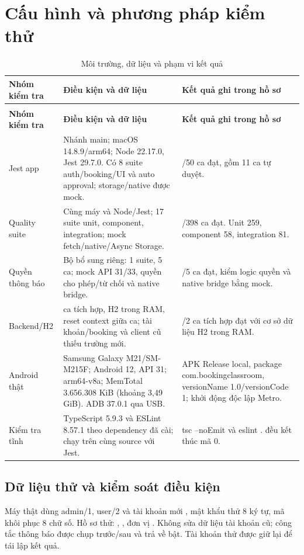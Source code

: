 \section{Cấu hình và phương pháp kiểm thử}
{\tabletext\renewcommand{\arraystretch}{1.04}\begin{longtable}{>{\raggedright\arraybackslash}p{}>{\raggedright\arraybackslash}p{}>{\raggedright\arraybackslash}p{}}
\caption{Môi trường, dữ liệu và phạm vi kết quả}\label{tab:test-env}\\
\toprule \textbf{Nhóm kiểm tra} & \textbf{Điều kiện và dữ liệu} & \textbf{Kết quả ghi trong hồ sơ}\\\midrule
\endfirsthead
\multicolumn{3}{l}{\small Môi trường, dữ liệu và phạm vi kết quả (tiếp)}\\
\toprule \textbf{Nhóm kiểm tra} & \textbf{Điều kiện và dữ liệu} & \textbf{Kết quả ghi trong hồ sơ}\\\midrule
\endhead
\bottomrule\endlastfoot
Jest app & Nhánh main; macOS 14.8.9/arm64; Node 22.17.0, Jest 29.7.0. Có 8 suite auth/booking/UI và auto approval; storage/native được mock. & 50/50 ca đạt, gồm 11 ca tự duyệt.\\
Quality suite & Cùng máy và Node/Jest; 17 suite unit, component, integration; mock fetch/native/Async Storage. & 398/398 ca đạt. Unit 259, component 58, integration 81.\\
Quyền thông báo & Bộ bổ sung riêng: 1 suite, 5 ca; mock API 31/33, quyền cho phép/từ chối và native bridge. & 5/5 ca đạt, kiểm logic quyền và native bridge bằng mock.\\
Backend/H2 & 2 ca tích hợp, H2 trong RAM, reset context giữa ca; tài khoản/booking và client cũ thiếu trường mới. & 2/2 ca tích hợp đạt với cơ sở dữ liệu H2 trong RAM.\\
Android thật & Samsung Galaxy M21/SM-M215F; Android 12, API 31; arm64-v8a; MemTotal 3.656.308 KiB (khoảng 3,49 GiB). ADB 37.0.1 qua USB. & APK Release local, package com.bookingclassroom, versionName 1.0/versionCode 1; khởi động độc lập Metro.\\
Kiểm tra tĩnh & TypeScript 5.9.3 và ESLint 8.57.1 theo dependency đã cài; chạy trên cùng source với Jest. & tsc --noEmit và eslint . đều kết thúc mã 0.\\
\end{longtable}}

\subsection{Dữ liệu thử và kiểm soát điều kiện}
Máy thật dùng admin/1, user/2 và tài khoản mới , mật khẩu thử 8 ký tự, mã khôi phục 8 chữ số. Hồ sơ thử: , , đơn vị . Không sửa dữ liệu tài khoản cũ; công tắc thông báo được chụp trước/sau và trả về bật. Tài khoản thử được giữ lại để tái lập kết quả.

